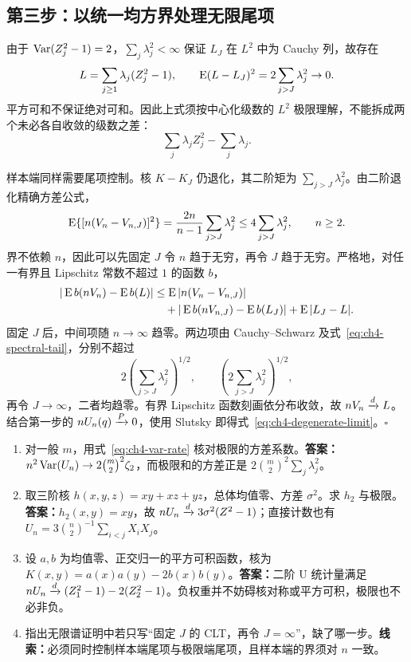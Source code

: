 \subsection{第三步：以统一均方界处理无限尾项}

由于 $\operatorname{Var}(Z_j^2-1)=2$，$\sum_j\lambda_j^2<\infty$ 保证 $L_J$ 在 $L^2$ 中为 Cauchy 列，故存在
\[
 L=\sum_{j\geq1}\lambda_j(Z_j^2-1),\qquad
 \operatorname{E}(L-L_J)^2=2\sum_{j>J}\lambda_j^2\to0.
\]
平方可和不保证绝对可和。因此上式须按中心化级数的 $L^2$ 极限理解，不能拆成两个未必各自收敛的级数之差：
\[
 \sum_j\lambda_j Z_j^2-\sum_j\lambda_j.
\]

样本端同样需要尾项控制。核 $K-K_J$ 仍退化，其二阶矩为 $\sum_{j>J}\lambda_j^2$。由二阶退化精确方差公式，
\begin{equation}
 \operatorname{E}\{[n(V_n-V_{n,J})]^2\}
 =\frac{2n}{n-1}\sum_{j>J}\lambda_j^2
 \leq4\sum_{j>J}\lambda_j^2,\qquad n\geq2.
 \label{eq:ch4-spectral-tail}
\end{equation}
界不依赖 $n$，因此可以先固定 $J$ 令 $n$ 趋于无穷，再令 $J$ 趋于无穷。严格地，对任一有界且 Lipschitz 常数不超过 $1$ 的函数 $b$，
\begin{align*}
 |\operatorname{E} b(nV_n)-\operatorname{E} b(L)|
 &\leq\operatorname{E}|n(V_n-V_{n,J})|\\
 &\quad+|\operatorname{E} b(nV_{n,J})-\operatorname{E} b(L_J)|
       +\operatorname{E}|L_J-L|.
\end{align*}
固定 $J$ 后，中间项随 $n\to\infty$ 趋零。两边项由 Cauchy--Schwarz 及式~\eqref{eq:ch4-spectral-tail}，分别不超过
\[
 2\left(\sum_{j>J}\lambda_j^2\right)^{1/2},\qquad
 \left(2\sum_{j>J}\lambda_j^2\right)^{1/2},
\]
再令 $J\to\infty$，二者均趋零。有界 Lipschitz 函数刻画依分布收敛，故 $nV_n\xrightarrow{d} L$。结合第一步的 $nU_n(q)\xrightarrow{P}0$，使用 Slutsky 即得式~\eqref{eq:ch4-degenerate-limit}。\hfill$\square$

\begin{notebox}[退化情形的核验与练习]
\begin{enumerate}
 \item 对一般 $m$，用式~\eqref{eq:ch4-var-rate} 核对极限的方差系数。\textbf{答案：}$n^2\operatorname{Var}(U_n)\to2\binom m2^2\zeta_2$，而极限和的方差正是 $2\binom m2^2\sum_j\lambda_j^2$。
 \item 取三阶核 $h(x,y,z)=xy+xz+yz$，总体均值零、方差 $\sigma^2$。求 $h_2$ 与极限。\textbf{答案：}$h_2(x,y)=xy$，故 $nU_n\xrightarrow{d}3\sigma^2(Z^2-1)$；直接计数也有 $U_n=3\binom n2^{-1}\sum_{i<j}X_iX_j$。
 \item 设 $a,b$ 为均值零、正交归一的平方可积函数，核为 $K(x,y)=a(x)a(y)-2b(x)b(y)$。\textbf{答案：}二阶 U 统计量满足 $nU_n\xrightarrow{d}(Z_1^2-1)-2(Z_2^2-1)$。负权重并不妨碍核对称或平方可积，极限也不必非负。
 \item 指出无限谱证明中若只写“固定 $J$ 的 CLT，再令 $J=\infty$”，缺了哪一步。\textbf{线索：}必须同时控制样本端尾项与极限端尾项，且样本端的界须对 $n$ 一致。
\end{enumerate}
\end{notebox}

